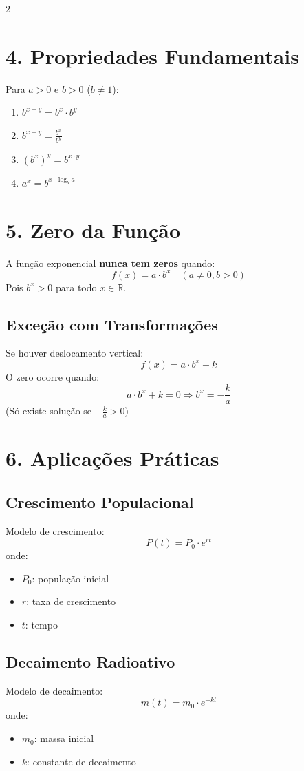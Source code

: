 \documentclass[11pt]{article}
\begin{document}
\begin{multicols}{2}
\section*{4. Propriedades Fundamentais}
Para $a > 0$ e $b > 0$ ($b \neq 1$):
\begin{enumerate}
    \item $b^{x+y} = b^x \cdot b^y$
    \item $b^{x-y} = \frac{b^x}{b^y}$
    \item $(b^x)^y = b^{x \cdot y}$
    \item $a^x = b^{x \cdot \log_b a}$
\end{enumerate}

\section*{5. Zero da Função}
A função exponencial \textbf{nunca tem zeros} quando:
\[
f(x) = a \cdot b^x \quad (a \neq 0, b > 0)
\]
Pois $b^x > 0$ para todo $x \in \mathbb{R}$.

\subsection*{Exceção com Transformações}
Se houver deslocamento vertical:
\[
f(x) = a \cdot b^x + k
\]
O zero ocorre quando:
\[
a \cdot b^x + k = 0 \Rightarrow b^x = -\frac{k}{a}
\]
(Só existe solução se $-\frac{k}{a} > 0$)

\section*{6. Aplicações Práticas}
\subsection*{Crescimento Populacional}
Modelo de crescimento:
\[
P(t) = P_0 \cdot e^{rt}
\]
onde:
\begin{itemize}
    \item $P_0$: população inicial
    \item $r$: taxa de crescimento
    \item $t$: tempo
\end{itemize}

\subsection*{Decaimento Radioativo}
Modelo de decaimento:
\[
m(t) = m_0 \cdot e^{-kt}
\]
onde:
\begin{itemize}
    \item $m_0$: massa inicial
    \item $k$: constante de decaimento
\end{itemize}


\end{multicols}
\end{document}
